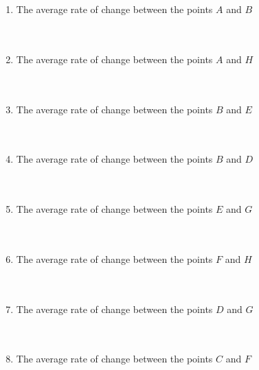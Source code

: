 \documentclass{article}
\begin{document}
\begin{enumerate}
    \item The average rate of change between the points $A$ and $B$
    \\\\\\
    \item The average rate of change between the points $A$ and $H$
    \\\\\\
    \item The average rate of change between the points $B$ and $E$
    \\\\\\
    \item The average rate of change between the points $B$ and $D$
    \\\\\\
    \item The average rate of change between the points $E$ and $G$
    \\\\\\
    \item The average rate of change between the points $F$ and $H$
    \\\\\\
    \item The average rate of change between the points $D$ and $G$
    \\\\\\
    \item The average rate of change between the points $C$ and $F$
\end{enumerate}

 
\end{document}
